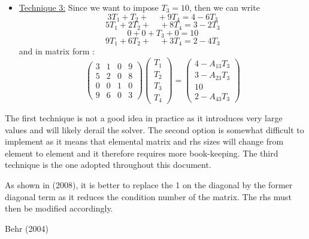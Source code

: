 \begin{itemize}
\item \underline{Technique 3:} Since we want to impose $T_3=10$, then we can write 
\[
3 T_1 + T_2 + \quad  + 9 T_4 = 4 - 6T_3
\]
\[
5 T_1 + 2T_2 + \quad + 8 T_4 = 3 - 2T_3
\]
\[
0 + 0 + T_3 + 0 = 10
\]
\[
9 T_1 + 6T_2 + \quad + 3 T_4 = 2 - 4T_3
\]
and in matrix form :
\[
\left(
\begin{array}{cccc}
3 & 1 & 0  & 9 \\
5 & 2 & 0  & 8 \\
0 & 0 & 1 & 0 \\
9 & 6 & 0  & 3
\end{array}
\right)
\left(
\begin{array}{c}
T_1 \\ T_2 \\ T_3 \\ T_4
\end{array}
\right)
=
\left(
\begin{array}{c}
4 - A_{13} T_3\\ 3 - A_{23}T_3 \\ 10 \\ 2-A_{43} T_3
\end{array}
\right)
\]

\end{itemize}

The first technique is not a good idea in practice as it introduces very large 
values and will likely derail the solver. The second option is somewhat difficult
to implement as it means that elemental matrix and rhs sizes will change from 
element to element and it therefore requires more book-keeping.
The third technique is the one adopted throughout this document. 

As shown in \textcite{wuxl08} (2008), it is better to replace the 1 on the diagonal 
by the former diagonal term as it reduces the condition number of the matrix. 
The rhs must then be modified accordingly.

\Literature Behr (2004) \cite{behr04}

